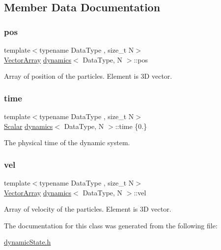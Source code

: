 \subsection{Member Data Documentation}
\mbox{\label{classdynamics_a79f983dcbf7107058280f798ab419b69}} 
\subsubsection{\texorpdfstring{pos}{pos}}
{\footnotesize\ttfamily template$<$typename Data\+Type , size\+\_\+t N$>$ \\
\mbox{\hyperlink{classdynamics_a41e25703d6668a66d96a1db3dc5df03b}{Vector\+Array}} \mbox{\hyperlink{classdynamics}{dynamics}}$<$ Data\+Type, N $>$\+::pos}



Array of position of the particles. Element is 3D vector. 

\mbox{\label{classdynamics_a95cb1723922c4224bf5d1118eed46c0c}} 
\subsubsection{\texorpdfstring{time}{time}}
{\footnotesize\ttfamily template$<$typename Data\+Type , size\+\_\+t N$>$ \\
\mbox{\hyperlink{classdynamics_a444c7534e86115117798563cb0e43cde}{Scalar}} \mbox{\hyperlink{classdynamics}{dynamics}}$<$ Data\+Type, N $>$\+::time \{0.\}}



The physical time of the dynamic system. 

\mbox{\label{classdynamics_a211067eb96b01c17d2fc73d1fc65d595}} 
\subsubsection{\texorpdfstring{vel}{vel}}
{\footnotesize\ttfamily template$<$typename Data\+Type , size\+\_\+t N$>$ \\
\mbox{\hyperlink{classdynamics_a41e25703d6668a66d96a1db3dc5df03b}{Vector\+Array}} \mbox{\hyperlink{classdynamics}{dynamics}}$<$ Data\+Type, N $>$\+::vel}



Array of velocity of the particles. Element is 3D vector. 



The documentation for this class was generated from the following file\+:\begin{DoxyCompactItemize}
\item 
\mbox{\hyperlink{dynamic_state_8h}{dynamic\+State.\+h}}\end{DoxyCompactItemize}
